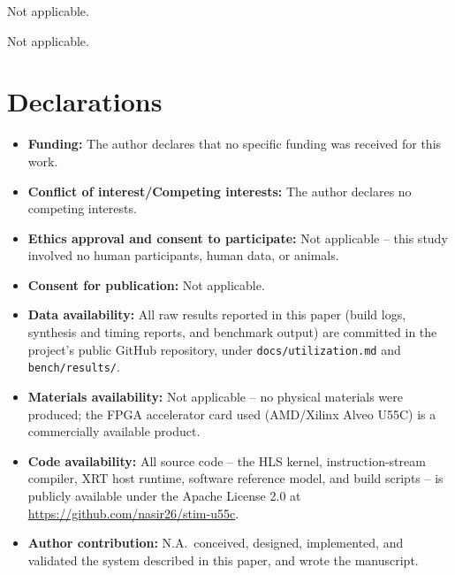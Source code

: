\documentclass[pdflatex,sn-basic]{sn-jnl}
\begin{document}
\backmatter


Not applicable.


Not applicable.

\section*{Declarations}

\begin{itemize}
\item \textbf{Funding:} The author declares that no specific funding was received for this work.
\item \textbf{Conflict of interest/Competing interests:} The author declares no competing interests.
\item \textbf{Ethics approval and consent to participate:} Not applicable -- this study involved no human participants, human data, or animals.
\item \textbf{Consent for publication:} Not applicable.
\item \textbf{Data availability:} All raw results reported in this paper (build logs, synthesis and timing reports, and benchmark output) are committed in the project's public GitHub repository, under \texttt{docs/utilization.md} and \texttt{bench/results/}.
\item \textbf{Materials availability:} Not applicable -- no physical materials were produced; the FPGA accelerator card used (AMD/Xilinx Alveo U55C) is a commercially available product.
\item \textbf{Code availability:} All source code -- the HLS kernel, instruction-stream compiler, XRT host runtime, software reference model, and build scripts -- is publicly available under the Apache License 2.0 at \url{https://github.com/nasir26/stim-u55c}.
\item \textbf{Author contribution:} N.A.\ conceived, designed, implemented, and validated the system described in this paper, and wrote the manuscript.
\end{itemize}
\end{document}
